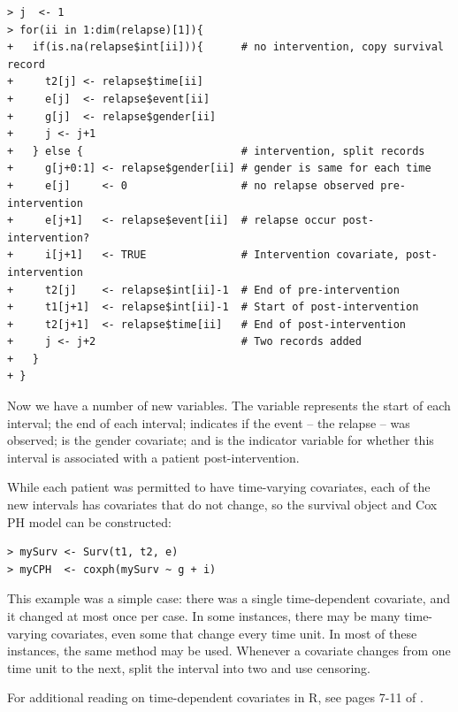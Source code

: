 \documentclass[11pt]{article}
\begin{document}
\begin{verbatim}
> j  <- 1
> for(ii in 1:dim(relapse)[1]){
+   if(is.na(relapse$int[ii])){      # no intervention, copy survival record
+     t2[j] <- relapse$time[ii]
+     e[j]  <- relapse$event[ii]
+     g[j]  <- relapse$gender[ii]
+     j <- j+1
+   } else {                         # intervention, split records
+     g[j+0:1] <- relapse$gender[ii] # gender is same for each time
+     e[j]     <- 0                  # no relapse observed pre-intervention
+     e[j+1]   <- relapse$event[ii]  # relapse occur post-intervention?
+     i[j+1]   <- TRUE               # Intervention covariate, post-intervention
+     t2[j]    <- relapse$int[ii]-1  # End of pre-intervention
+     t1[j+1]  <- relapse$int[ii]-1  # Start of post-intervention
+     t2[j+1]  <- relapse$time[ii]   # End of post-intervention
+     j <- j+2                       # Two records added
+   }
+ }
\end{verbatim}
Now we have a number of new variables. The  variable represents the start of each interval;  the end of each interval;  indicates if the event -- the relapse -- was observed;  is the gender covariate; and  is the indicator variable for whether this interval is associated with a patient post-intervention.

While each patient was permitted to have time-varying covariates, each of the new intervals has covariates that do not change, so the survival object and Cox PH model can be constructed:
\begin{verbatim}
> mySurv <- Surv(t1, t2, e)
> myCPH  <- coxph(mySurv ~ g + i)
\end{verbatim}

This example was a simple case: there was a single time-dependent covariate, and it changed at most once per case. In some instances, there may be many time-varying covariates, even some that change every time unit. In most of these instances, the same method may be used. Whenever a covariate changes from one time unit to the next, split the interval into two and use censoring.

For additional reading on time-dependent covariates in R, see pages 7-11 of .
\end{document}
